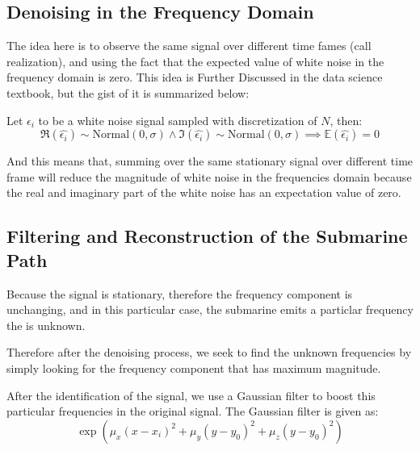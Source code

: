 \documentclass{article}
\begin{document}
\subsection{Denoising in the Frequency Domain}
    \hspace{1.1em}
    The idea here is to observe the same signal over different time fames (call realization), and using the fact that the expected value of white noise in the frequency domain is zero. This idea is Further Discussed in the data science textbook\cite{kutz_2013_pg316}, but the gist of it is summarized below: 
    \par
    Let $\epsilon_i$ to be a white noise signal sampled with discretization of $N$, then: 
    \begin{equation}
        \Re(\widehat{\epsilon_i}) \sim\text{Normal}(0, \sigma) \wedge 
        \Im(\widehat{\epsilon_i}) \sim\text{Normal}(0, \sigma)
        \implies \mathbb{E}(\widehat{\epsilon_i}) = 0
    \end{equation}
    \par
    And this means that, summing over the same stationary signal over different time frame will reduce the magnitude of white noise in the frequencies domain because the real and imaginary part of the white noise has an expectation value of zero. 

\subsection{Filtering and Reconstruction of the Submarine Path}
    \hspace{1.1em}
    Because the signal is stationary, therefore the frequency component is unchanging, and in this particular case, the submarine emits a particlar frequency the is unknown. 
    
    \par
    Therefore after the denoising process, we seek to find the unknown frequencies by simply looking for the frequency component that has maximum magnitude.
    
    \par
    After the identification of the signal, we use a Gaussian filter to boost this particular frequencies in the original signal. The Gaussian filter is given as: 
    \begin{equation}\label{eqn:gaussian-filter}
        \exp
        \left(\mu_x (x - x_i)^2 +
                \mu_y(y - y_0)^2
                +\mu_z(y - y_0)^2\right)
    \end{equation}
    
\end{document}

